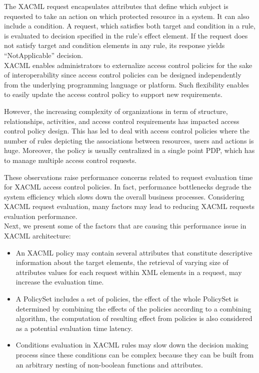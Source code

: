 The XACML request encapsulates attributes that define which subject is requested to take an action on which protected resource in a system.
It can also include a condition. A request, which satisfies both target and condition in a rule, is evaluated
to decision specified in the rule's effect element. If the request does not satisfy target and condition elements in any rule, its response yields ``NotApplicable'' decision.
\\XACML enables administrators to externalize access control policies for the sake of interoperability since access control policies can be designed 
independently from the underlying programming language or platform. Such flexibility enables to easily update the access control policy to support new requirements.

However, the increasing complexity of organizations in term of structure, relationships, activities, and access control requirements has impacted 
access control policy design. This has led to deal with access control policies where the number of rules depicting the associations between resources, 
users and actions is huge. Moreover, the policy is usually centralized in a single point PDP, which 
has to manage multiple access control requests.

These observations raise performance concerns related to request evaluation time for XACML access control policies. 
In fact, performance bottlenecks degrade the system efficiency which slows down the overall business processes. 
Considering XACML request evaluation, many factors may lead to reducing XACML requests evaluation performance.  
\\
Next, we present some of the factors that are causing this performance issue in XACML architecture:

\begin{itemize}
\item An XACML policy may contain several attributes that constitute descriptive information about the target elements, the retrieval of
 varying size of attributes values for each request within XML elements in a request, may increase the evaluation time.
\item A PolicySet includes a set of policies, the effect of the whole
PolicySet is determined by combining the effects of the policies according to a combining algorithm, the computation of resulting effect 
from policies is also considered as a potential evaluation time latency.
\item Conditions evaluation in XACML rules may slow down the decision making process since these conditions can be complex because they can 
be built from an arbitrary nesting of non-boolean functions and attributes. 
\end{itemize}

